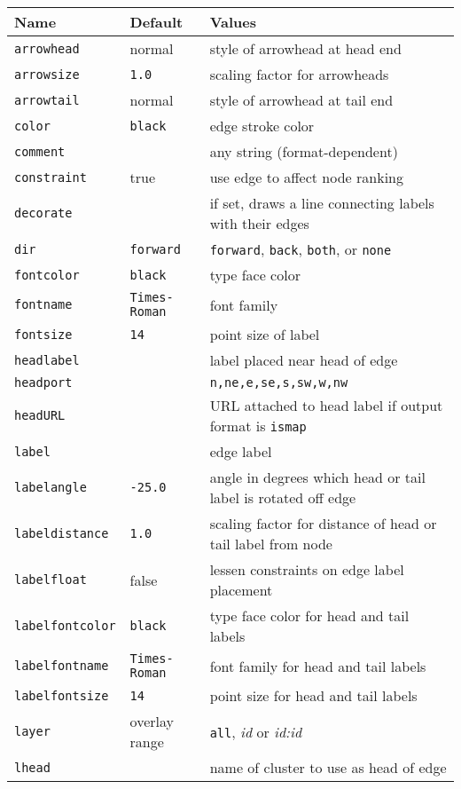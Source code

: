\documentclass[11pt]{article}
\begin{document}
\begin{table}[p]
\begin{tabular}[t]{|l|l|p{3.5in}|} \hline
Name & Default & Values \\ \hline
{\tt arrowhead} & normal & style of arrowhead at head end \\
{\tt arrowsize} & {\tt 1.0} & scaling factor for arrowheads \\
{\tt arrowtail} & normal & style of arrowhead at tail end \\
{\tt color} & {\tt black} & edge stroke color \\
{\tt comment} & & any string (format-dependent) \\
{\tt constraint} & true & use edge to affect node ranking \\
{\tt decorate} & & if set, draws a line connecting labels with their edges \\
{\tt dir} & {\tt forward} & {\tt forward}, {\tt back}, {\tt both}, or {\tt none} \\ 
{\tt fontcolor} & {\tt black} & type face color \\
{\tt fontname} & {\tt Times-Roman} & font family \\
{\tt fontsize} & {\tt 14} & point size of label \\
{\tt headlabel} & & label placed near head of edge \\
{\tt headport} & & {\tt n,ne,e,se,s,sw,w,nw}\\
{\tt headURL} & & URL attached to head label if output format is {\tt ismap} \\
{\tt label} & & edge label \\
{\tt labelangle} & {\tt -25.0} & angle in degrees which head or tail label
is rotated off edge \\
{\tt labeldistance} & {\tt 1.0} & scaling factor for distance of head or tail label from node \\
{\tt labelfloat} & false & lessen constraints on edge label placement \\
{\tt labelfontcolor} & {\tt black} & type face color for head and tail labels\\
{\tt labelfontname} & {\tt Times-Roman} & font family for head and tail labels\\
{\tt labelfontsize} & {\tt 14} & point size for head and tail labels \\
{\tt layer} & overlay range & {\tt all}, {\it id} or {\it id:id} \\
{\tt lhead} & & name of cluster to use as head of edge \\

\end{tabular}
\end{table}
\end{document}
